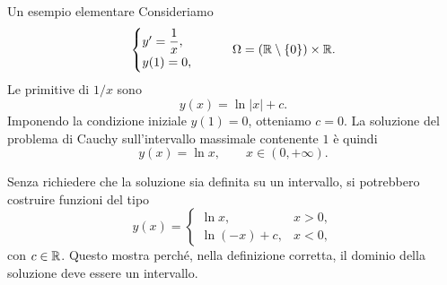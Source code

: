 \documentclass[a4paper]{article}
\begin{document}
\begin{radioactive}
\begin{snippetexample}{Un esempio elementare}
    Consideriamo
    \[
        \begin{cases}
            y'=\dfrac{1}{x},\\
            y(1)=0,
        \end{cases}
        \qquad
        \Omega=(\mathbb{R}\setminus\{0\})\times\mathbb{R}.
    \]
    Le primitive di \(1/x\) sono
    \[
        y(x)=\ln|x|+c.
    \]
    Imponendo la condizione iniziale \(y(1)=0\), otteniamo \(c=0\). La soluzione del problema di Cauchy sull'intervallo massimale contenente \(1\) è quindi
    \[
        y(x)=\ln x,
        \qquad x\in(0,+\infty).
    \]

    \begin{center}
    \end{center}

    Senza richiedere che la soluzione sia definita su un intervallo, si potrebbero costruire funzioni del tipo
    \[
        y(x)=
        \begin{cases}
            \ln x, & x>0,\\
            \ln(-x)+c, & x<0,
        \end{cases}
    \]
    con \(c\in\mathbb{R}\). Questo mostra perché, nella definizione corretta, il dominio della soluzione deve essere un intervallo.
\end{snippetexample}
\end{radioactive}
\end{document}

